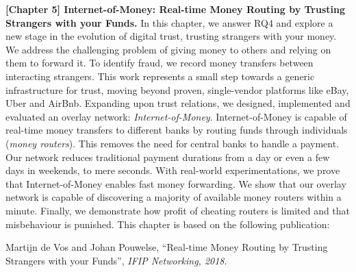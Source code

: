 \textbf{[Chapter 5] Internet-of-Money: Real-time Money Routing by Trusting Strangers with your Funds.}
In this chapter, we answer RQ4 and explore a new stage in the evolution of digital trust, trusting strangers with your money.
We address the challenging problem of giving money to others and relying on them to forward it.
To identify fraud, we record money transfers between interacting strangers.
This work represents a small step towards a generic infrastructure for trust, moving beyond proven, single-vendor platforms like eBay, Uber and AirBnb.
Expanding upon trust relations, we designed, implemented and evaluated an overlay network: \emph{Internet-of-Money}.
Internet-of-Money is capable of real-time money transfers to different banks by routing funds through individuals (\emph{money routers}).
This removes the need for central banks to handle a payment.
Our network reduces traditional payment durations from a day or even a few days in weekends, to mere seconds.
With real-world experimentations, we prove that Internet-of-Money enables fast money forwarding.
We show that our overlay network is capable of discovering a majority of available money routers within a minute.
Finally, we demonstrate how profit of cheating routers is limited and that misbehaviour is punished.
This chapter is based on the following publication:

Martijn de Vos and Johan Pouwelse, \enquote{Real-time Money Routing by Trusting Strangers with your Funds}, \emph{IFIP Networking, 2018}.\\

